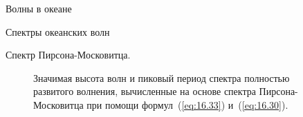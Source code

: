 \begin{chapter}{Волны в океане}
\begin{section}{Спектры океанских волн}
\begin{paragraph}{Спектр Пирсона-Московитца.}
\begin{figure}[b!]
\caption{Значимая высота волн и пиковый период спектра
полностью развитого волнения, вычисленные на основе спектра Пирсона-Московитца
при помощи формул~(\ref{eq:16.33}) и~(\ref{eq:16.30}).}
\label{fig:wavehtperiod}
\end{figure}
%
%


\end{paragraph}
\end{section}
\end{chapter}
